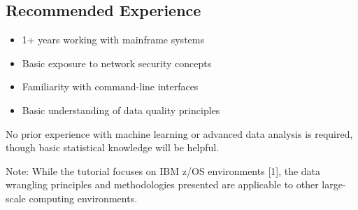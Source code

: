 \documentclass[a4paper]{article}
\begin{document}
\subsection{Recommended Experience}
    \begin{itemize}
        \item 1+ years working with mainframe systems
        \item Basic exposure to network security concepts
        \item Familiarity with command-line interfaces
        \item Basic understanding of data quality principles
    \end{itemize}
    
No prior experience with machine learning or advanced data analysis is required, though basic statistical knowledge will be helpful.

Note: While the tutorial focuses on IBM z/OS environments [1], the data wrangling principles and methodologies presented are applicable to other large-scale computing environments.
\end{document}
